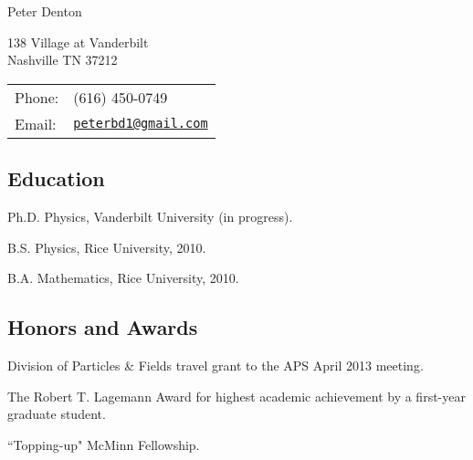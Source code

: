 \documentclass[letterpaper]{article}
\def\name{Peter Denton}
\renewenvironment{itemize}{
\begin{list}{}{
\setlength{\leftmargin}{1.5em}
}
}{
\end{list}
}
\begin{document}
{\huge \name}


\vspace{0.1in}

\begin{minipage}{0.45\linewidth}
138 Village at Vanderbilt\\
Nashville TN 37212
\end{minipage}
\begin{minipage}{0.45\linewidth}
\begin{tabular}{ll}
Phone: & (616) 450-0749\\
Email: & \href{mailto:peterbd1@gmail.com}{\tt peterbd1@gmail.com} \\
\end{tabular}
\end{minipage}
\subsection*{Education}
\begin{itemize}
\item Ph.D. Physics, Vanderbilt University (in progress).
\item B.S. Physics, Rice University, 2010.
\item B.A. Mathematics, Rice University, 2010.
\end{itemize}
\subsection*{Honors and Awards}
\begin{itemize}
\item Division of Particles \& Fields travel grant to the APS April 2013 meeting.
\item The Robert T. Lagemann Award for highest academic achievement by a first-year graduate student.
\item ``Topping-up" McMinn Fellowship.
\end{itemize}
\end{document}
